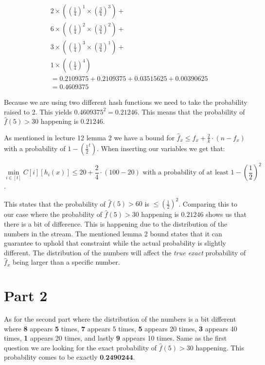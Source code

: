 \documentclass{article}
\begin{document}
\begin{align*}
&2 \times \left(\left(\frac{1}{4}\right)^1 \times \left(\frac{3}{4}\right)^3\right) + \\
&6 \times \left(\left(\frac{1}{4}\right)^2 \times \left(\frac{3}{4}\right)^2\right) + \\
&3 \times \left(\left(\frac{1}{4}\right)^3 \times \left(\frac{3}{4}\right)^1\right) + \\
&1 \times \left(\left(\frac{1}{4}\right)^4\right) \\
&= 0.2109375 + 0.2109375 + 0.03515625 + 0.00390625 \\
&= 0.4609375
\end{align*}

\noindent Because we are using two different hash functions we need to take the probability raised to 2. This yields \(0.4609375^2 = 0.21246\). This means that the probability of \(\hat{f}(5) > 30\) happening is \(0.21246\).

\noindent As mentioned in lecture 12 lemma 2 \cite{Lecture12} we have a bound for \(\hat{f}_x \leq f_x + \frac{2}{k} \cdot (n - f_x)\) with a probability of \(1-\left(\frac{1}{2}^t\right)\). When inserting our variables we get that:


\[\min_{i \in [t]} C[i][h_i(x)] \leq 20 + \frac{2}{4} \cdot (100 - 20) \text{ with a probability of at least } 1 - \left(\frac{1}{2}\right)^2\].

\noindent This states that the probability of \(\hat{f}(5) > 60\) is \(\leq \left(\frac{1}{2}\right)^2\). Comparing this to our case where the probability of \(\hat{f}(5) > 30\) happening is \(0.21246\) shows us that there is a bit of difference. This is happening due to the distribution of the numbers in the stream. The mentioned lemma 2 bound states that it can guarantee to uphold that constraint while the actual probability is slightly different. The distribution of the numbers will affect the \textit{true exact} probability of \(\hat{f}_x\) being larger than a specific number.

\section{Part 2}
As for the second part where the distribution of the numbers is a bit different where \textbf{8} appears \textbf{5} times,\textbf{ 7} appears 5 times, \textbf{5} appears 20 times,\textbf{ 3} appears 40 times,\textbf{ 1 }appears 20 times, and lastly \textbf{ 9} appears 10 times. Same as the first question we are looking for the exact probability of \(\hat{f}(5) > 30\) happening. This probability comes to be exactly \(\textbf{0.2490244}\). \\
\end{document}
